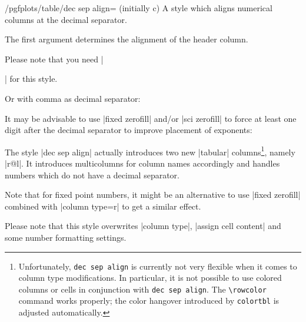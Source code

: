 \begin{stylekey}{/pgfplots/table/dec sep align= (initially c)}
	A style which aligns numerical columns at the decimal separator.

	The first argument determines the alignment of the header column. 

	Please note that you need |\usepackage{array}| for this style.
\begin{codeexample}[]
\end{codeexample}

	Or with comma as decimal separator:
\begin{codeexample}[]
\end{codeexample}
	It may be advisable to use |fixed zerofill| and/or |sci zerofill| to force at least one digit after the decimal separator to improve placement of exponents:
\begin{codeexample}[]
\end{codeexample}

	The style |dec sep align| actually introduces two new |tabular| columns\footnote{Unfortunately, \texttt{dec sep align} is currently not very flexible when it comes to column type modifications. In particular, it is not possible to use colored columns or cells in conjunction with \texttt{dec sep align}. The \texttt{\textbackslash rowcolor} command works properly; the color hangover introduced by \texttt{colortbl} is adjusted automatically.}, namely |r@{}l|. It introduces multicolumns for column names accordingly and handles numbers which do not have a decimal separator. 
	

	Note that for fixed point numbers, it might be an alternative to use |fixed zerofill| combined with |column type=r| to get a similar effect.

	Please note that this style overwrites |column type|, |assign cell content| and some number formatting settings.
\end{stylekey}


